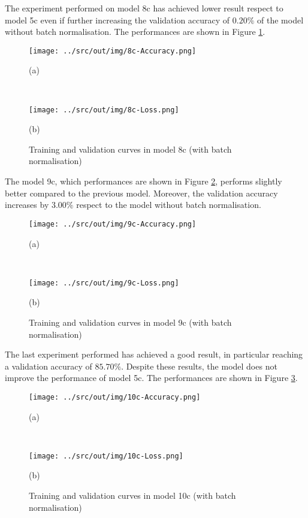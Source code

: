\documentclass[a4paper,12pt]{article} %
\begin{document}
	The experiment performed on model 8c has achieved lower result respect to 
	model 5c even if further increasing the validation accuracy of $0.20\%$ of 
	the model without batch normalisation. 
	The performances are shown in Figure \ref{fig:model8c-performance}.
	\newline

	\begin{figure}[htb]
		\begin{minipage}[c]{.49\textwidth}
			\centering
			\texttt{[image: ../src/out/img/8c-Accuracy.png]}
			\caption*{(a)}
		\end{minipage}
		~
		\begin{minipage}[c]{.49\textwidth}
			\centering
			\texttt{[image: ../src/out/img/8c-Loss.png]}
			\caption*{(b)}
		\end{minipage}
		\caption{Training and validation curves in model 8c (with batch 
			normalisation)}
		\label{fig:model8c-performance}
	\end{figure}
	
	The model 9c, which performances are shown in Figure 
	\ref{fig:model9c-performance}, performs slightly better compared to the 
	previous model. Moreover, the validation accuracy increases by $3.00\%$ 
	respect to the model without batch normalisation.
		
	\begin{figure}[H]
		\begin{minipage}[c]{.49\textwidth}
			\centering
			\texttt{[image: ../src/out/img/9c-Accuracy.png]}
			\caption*{(a)}
		\end{minipage}
		~
		\begin{minipage}[c]{.49\textwidth}
			\centering
			\texttt{[image: ../src/out/img/9c-Loss.png]}
			\caption*{(b)}
		\end{minipage}
		\caption{Training and validation curves in model 9c (with batch 
			normalisation)}
		\label{fig:model9c-performance}
	\end{figure}
	
	The last experiment performed has achieved a good result, in particular 
	reaching a validation accuracy of $85.70\%$. Despite these results, the 
	model does not improve the performance of model 5c.
	The performances are shown in Figure \ref{fig:model10c-performance}.
	\newline
	
	\begin{figure}[htb]
		\begin{minipage}[c]{.49\textwidth}
			\centering
			\texttt{[image: ../src/out/img/10c-Accuracy.png]}
			\caption*{(a)}
		\end{minipage}
		~
		\begin{minipage}[c]{.49\textwidth}
			\centering
			\texttt{[image: ../src/out/img/10c-Loss.png]}
			\caption*{(b)}
		\end{minipage}
		\caption{Training and validation curves in model 10c (with batch 
			normalisation)}
		\label{fig:model10c-performance}
	\end{figure}
\end{document}
